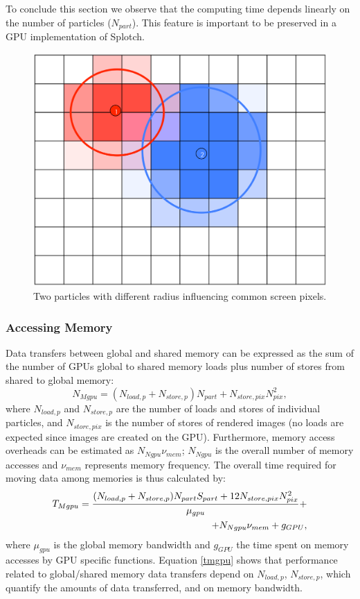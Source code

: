 \documentclass[smallextended]{svjour3}
\begin{document}
To conclude this section we observe that the computing time depends linearly on the number of particles ($N_{part}$). This feature is important to be preserved in a GPU implementation of Splotch.

\begin{figure}
\includegraphics[scale=0.1]{particles.eps}
\caption{Two particles with different radius influencing common screen pixels.}
\label{fig:particles}
\end{figure}

\subsubsection{Accessing Memory}
Data transfers between global and shared memory can be expressed 
as the sum of the number of GPUs global to shared memory loads plus number of stores from shared to global memory:
\begin{equation}
N_{Mgpu} = (N_{load,p} + N_{store,p}) N_{part} + N_{store,pix} N_{pix}^2,
\end{equation}
where $N_{load,p}$ and $N_{store,p}$ are the number of loads and stores of individual 
particles, and $N_{store,pix}$ is the number of stores of rendered images (no loads 
are expected since images are created on the GPU). 
Furthermore, memory access overheads can be estimated as $N_{Ngpu} \nu_{mem}$; $N_{Ngpu}$ is the overall number of memory accesses and $\nu_{mem}$ represents memory frequency. The overall time required for moving data among memories is thus calculated by:
\begin{equation}\label{tmgpu}
\begin{split}
T_{Mgpu} = {(N_{load,p} + N_{store,p}) N_{part} S_{part}
+ 12 N_{store,pix} N_{pix}^2\over \mu_{gpu}} + \\
+ N_{Ngpu} \nu_{mem} + g_{GPU},
\end{split}
\end{equation}
where $\mu_{gpu}$ is the global memory bandwidth
and $g_{GPU}$ the time 
spent on memory accesses by GPU specific functions. Equation \eqref{tmgpu} shows that performance related to global/shared memory data transfers depend on $N_{load,p}$, $N_{store,p}$, which quantify the amounts of data transferred, and on memory bandwidth.
\end{document}
